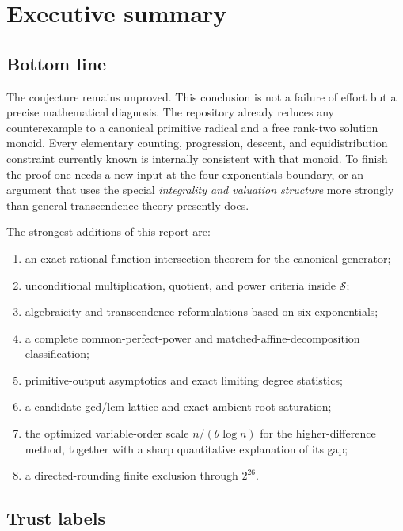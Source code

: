 \documentclass[11pt,oneside]{article}
\theoremstyle{definition}
\newcommand{\Sol}{\mathcal S}
\begin{document}
\tableofcontents
\newpage

\section{Executive summary}\label{sec:executive}

\subsection{Bottom line}

The conjecture remains unproved.  This conclusion is not a failure of effort but a precise
mathematical diagnosis.  The repository already reduces any counterexample to a canonical
primitive radical and a free rank-two solution monoid.  Every elementary counting,
progression, descent, and equidistribution constraint currently known is internally
consistent with that monoid.  To finish the proof one needs a new input at the
four-exponentials boundary, or an argument that uses the special \emph{integrality and
valuation structure} more strongly than general transcendence theory presently does.

The strongest additions of this report are:
\begin{enumerate}
\item an exact rational-function intersection theorem for the canonical generator;
\item unconditional multiplication, quotient, and power criteria inside \(\Sol\);
\item algebraicity and transcendence reformulations based on six exponentials;
\item a complete common-perfect-power and matched-affine-decomposition classification;
\item primitive-output asymptotics and exact limiting degree statistics;
\item a candidate gcd/lcm lattice and exact ambient root saturation;
\item the optimized variable-order scale \(n/(\theta\log n)\) for the higher-difference
method, together with a sharp quantitative explanation of its gap;
\item a directed-rounding finite exclusion through \(2^{26}\).
\end{enumerate}

\subsection{Trust labels}
\end{document}
